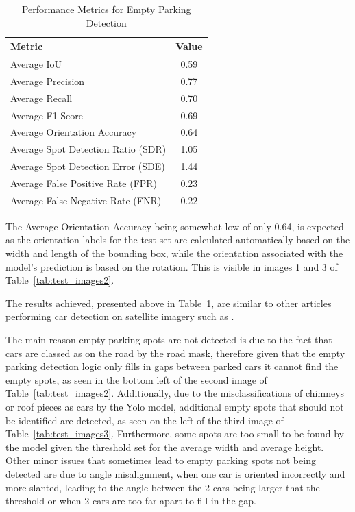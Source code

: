 \begin{table}[htbp]
  \centering
  \begin{tabular}{|l|c|}
    \hline
    \textbf{Metric}                    & \textbf{Value} \\ \hline
    Average IoU                        & 0.59           \\ \hline
    Average Precision                  & 0.77           \\ \hline
    Average Recall                     & 0.70           \\ \hline
    Average F1 Score                   & 0.69           \\ \hline
    Average Orientation Accuracy       & 0.64           \\ \hline
    Average Spot Detection Ratio (SDR) & 1.05           \\ \hline
    Average Spot Detection Error (SDE) & 1.44           \\ \hline
    Average False Positive Rate (FPR)  & 0.23           \\ \hline
    Average False Negative Rate (FNR)  & 0.22           \\ \hline
  \end{tabular}
  \caption{Performance Metrics for Empty Parking Detection}
  \label{tab:metrics2}
\end{table}


The Average Orientation Accuracy being somewhat low of only 0.64, is expected as the orientation labels for the test set are calculated automatically based on the width and length of the bounding box, while the orientation associated with the model’s prediction is based on the rotation. This is visible in images 1 and 3 of Table~\ref{tab:test_images2}.

The results achieved, presented above in Table~\ref{tab:metrics2}, are similar to other articles performing car detection on satellite imagery such as \cite{similarresults}.

The main reason empty parking spots are not detected is due to the fact that cars are classed as on the road by the road mask, therefore given that the empty parking detection logic only fills in gaps between parked cars it cannot find the empty spots, as seen in the bottom left of the second image of Table~\ref{tab:test_images2}.
Additionally, due to the misclassifications of chimneys or roof pieces as cars by the Yolo model, additional empty spots that should not be identified are detected, as seen on the left of the third image of Table~\ref{tab:test_images3}.
Furthermore, some spots are too small to be found by the model given the threshold set for the average width and average height.\\
Other minor issues that sometimes lead to empty parking spots not being detected are due to angle misalignment, when one car is oriented incorrectly and more slanted, leading to the angle between the 2 cars being larger that the threshold or when 2 cars are too far apart to fill in the gap.

